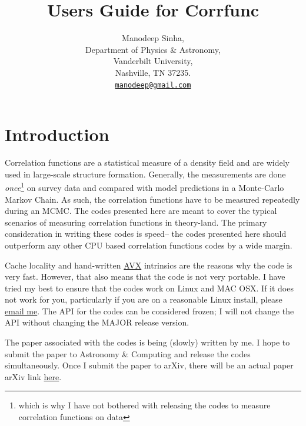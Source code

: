 \documentclass[12pt,titlepage]{article}
\begin{document}
\title{Users Guide for Corrfunc}
\author{Manodeep Sinha, \\
  Department of Physics \& Astronomy,\\
  Vanderbilt University,\\
  Nashville, TN 37235.\\
  \href{mailto:manodeep@gmail.com}{\texttt{manodeep@gmail.com}}
}

\maketitle 

\tableofcontents
{}

\section{Introduction}
Correlation functions are a statistical measure of a density field and are widely used in large-scale structure formation. Generally, 
the measurements are done {\em once}\footnote{which is why I have not bothered with releasing the codes to measure correlation 
functions on data} on survey data and compared with model predictions in a Monte-Carlo Markov Chain. As such, the 
correlation functions have to be measured repeatedly during an MCMC. The codes presented here are meant to cover the typical scenarios 
of measuring correlation functions in theory-land. The primary consideration in writing these codes is speed\footnotemark -- the codes 
presented here should outperform any other CPU based correlation functions codes by a wide margin. 

Cache locality and hand-written \href{http://en.wikipedia.org/wiki/Advanced_Vector_Extensions}{AVX} intrinsics are the reasons why the code is very fast. However, that also means that the code is 
not very portable. I have tried my best to ensure that the codes work on Linux and MAC OSX. If it does not work for you, particularly 
if you are on a reasonable Linux install, please \href{mailto:manodeep@gmail.com}{email me}. The API for the codes can be considered 
frozen; I will not change the API without changing the MAJOR release version. 

The paper associated with the codes is being (slowly) written by me. I hope to submit the paper to Astronomy \& Computing and release 
the codes simultaneously. Once I submit the paper to arXiv, there will be an actual paper arXiv link \href{valid arXiv link}{here}.
\end{document}
